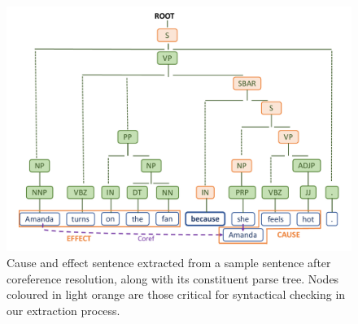 \begin{figure}[t!]
	\centering
	\includegraphics[width=\columnwidth]{parse.pdf}
	\caption{Cause and effect sentence extracted from a sample sentence after coreference resolution, along with its constituent parse tree. Nodes coloured in light orange are those critical for syntactical checking in our extraction process.}
	\label{fig:parse}
\end{figure}
